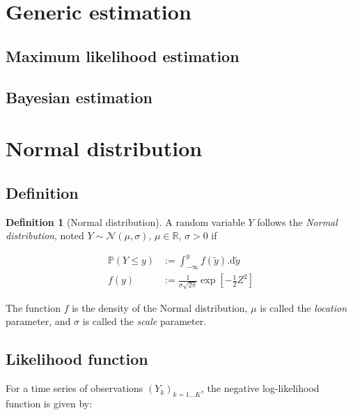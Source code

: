 \documentclass[12pt,a4paper]{article}
\theoremstyle{plain}
\theoremstyle{definition}
\newtheorem{definition}{Definition}[section]
\theoremstyle{remark}
\newcommand{\PP}{\mathbb{P}}
\newcommand{\RR}{\mathbb{R}}
\newcommand{\nN}{\mathcal{N}}
\begin{document}

\section{Generic estimation} %

\subsection{Maximum likelihood estimation} %


\subsection{Bayesian estimation} %



\section{Normal distribution}\label{sec::normal} %

\subsection{Definition} %

\begin{definition}[Normal distribution] A random variable $Y$ follows
the \emph{Normal distribution}, noted $Y\sim\nN(\mu,\sigma)$,
$\mu\in\RR$, $\sigma>0$ if

\[
\begin{aligned}
\PP(Y\leq y) &:= \int_{-\infty}^y f(\tilde{y}).\mathrm{d}\tilde{y}\\
f(y) &:= \frac{1}{\sigma\sqrt{2\pi}} \exp\left[-\frac{1}{2}Z^2 \right]
\end{aligned}
\]

\noindent The function $f$ is the density of the Normal distribution, $\mu$ is
called the \emph{location} parameter, and $\sigma$ is called the \emph{scale}
parameter.

\end{definition}


\subsection{Likelihood function} %

\noindent For a time series of observations $(Y_k)_{k=1\dots K}$, the negative
log-likelihood function is given by:
\end{document}
